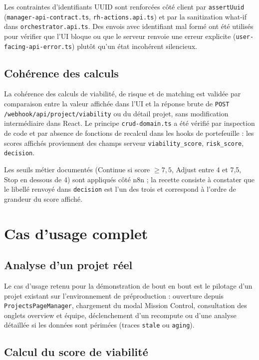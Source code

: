 Les contraintes d'identifiants UUID sont renforcées côté client par \texttt{assertUuid} (\texttt{manager-api-contract.ts}, \texttt{rh-actions.api.ts}) et par la sanitization what-if dans \texttt{orchestrator.api.ts}. Des envois avec identifiant mal formé ont été utilisés pour vérifier que l'UI bloque ou que le serveur renvoie une erreur explicite (\texttt{user-facing-api-error.ts}) plutôt qu'un état incohérent silencieux.

\subsection{Cohérence des calculs}

La cohérence des calculs de viabilité, de risque et de matching est validée par comparaison entre la valeur affichée dans l'UI et la réponse brute de \texttt{POST /webhook/api/project/viability} ou du détail projet, sans modification intermédiaire dans React. Le principe \texttt{crud-domain.ts} a été vérifié par inspection de code et par absence de fonctions de recalcul dans les hooks de portefeuille : les scores affichés proviennent des champs serveur \texttt{viability\_score}, \texttt{risk\_score}, \texttt{decision}.

Les seuils métier documentés (Continue si score $\geq 7{,}5$, Adjust entre 4 et 7{,}5, Stop en dessous de 4) sont appliqués côté n8n ; la recette consiste à constater que le libellé renvoyé dans \texttt{decision} est l'un des trois et correspond à l'ordre de grandeur du score affiché.

\section{Cas d'usage complet}

\subsection{Analyse d'un projet réel}

Le cas d'usage retenu pour la démonstration de bout en bout est le pilotage d'un projet existant sur l'environnement de préproduction : ouverture depuis \texttt{ProjectsPageManager}, chargement du modal Mission Control, consultation des onglets overview et équipe, déclenchement d'un recompute ou d'une analyse détaillée si les données sont périmées (traces \texttt{stale} ou \texttt{aging}).

\subsection{Calcul du score de viabilité}

